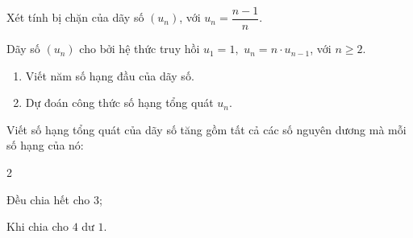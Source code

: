 \begin{ex}%
	 Xét tính bị chặn của dãy số $\left(u_{n}\right)$, với $u_{n}=\dfrac{n-1}{n}$.
\end{ex}

\begin{ex}%
	Dãy số $(u_n)$ cho bởi hệ thức truy hồi $u_1=1,$ $ u_n=n \cdot u_{n-1}$,  với $n \geq 2$.
	\begin{enumerate}
		\item Viết năm  số hạng đầu của dãy số.
		\item  Dự đoán công thức số hạng tổng quát $u_n$.
	\end{enumerate}
\end{ex}

\begin{ex}%
	Viết số hạng tổng  quát của dãy số tăng gồm tất cả các số nguyên dương mà mỗi số hạng của nó:
	\begin{enumEX}[a)]{2}
		\item Đều chia hết cho  $3$;
		\item Khi chia cho $4$  dư $1$.
	\end{enumEX}
\end{ex}

